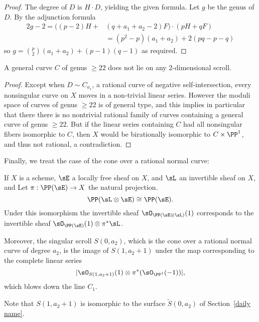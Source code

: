 \begin{proof} The degree of $D$ is $H\cdot D$, yielding the given formula. Let $g$ be the genus of $D$. 
By the adjunction formula
\begin{align*}
2g-2 =  \bigl((p-2)H+&(q+a_{1}+a_{2}-2)F\bigr)\cdot (pH+qF)\\ 
 &= (p^{2}-p)(a_{1}+a_{2})+2(pq-p-q)
\end{align*}
so $g = {p\choose 2}(a_{1}+a_{2}) + (p-1)(q-1)$ as required.
\end{proof}

\begin{fact}
A general curve $C$ of  genus $\geq 22$ does not lie on any 2-dimensional scroll.
\end{fact}
\begin{proof}
Except when $D\sim C_{a_{1}}$, a rational curve of negative self-intersection, every nonsingular curve on $X$ moves in a non-trivial linear series. However the moduli space of curves of genus $\geq 22$ is of general type, and this implies in particular that there there is no nontrivial rational family of curves containing a general curve of 
genus $\geq 22$. But if the linear series containing $C$ had all nonsingular fibers isomorphic to $C$, then
$X$ would be birationally isomorphic to $C\times \PP^{1}$, and thus not rational, a contradiction.
\end{proof}


Finally, we treat the case of the cone over a rational normal curve:
\begin{proposition}\label{singular scrolls}
If $X$ is a scheme, $\sE$ a locally free sheaf on $X$, and $\sL$ an invertible sheaf on $X$, 
and Let $\pi: \PP(\sE)\to X$ the natural projection.
$$
\PP(\sL \otimes \sE)\cong \PP(\sE).
$$
Under this isomorphism the invertible sheaf $\sO_{\PP(\sE\otimes \sL)}(1)$ corresponds to the invertible sheaf
$\sO_{\PP(\sE)}(1)\otimes \pi^{*}\sL$. 

Moreover, the singular scroll $S(0,a_{2})$, which is the cone over a rational normal curve of degree $a_{2}$, is the image of
$S(1, a_{2}+1)$ under the map corresponding to the complete linear series 
$$
|\sO_{S(1, a_{2}+1)}(1) \otimes \pi^{*}(\sO_{\PP^{1}}(-1))|,
$$
which blows down the line $C_{1}$.
\end{proposition}

Note that $S(1,a_2+1)$ is isomorphic to the surface $\tilde S(0, a_2)$ of Section~\ref{daily name}.

